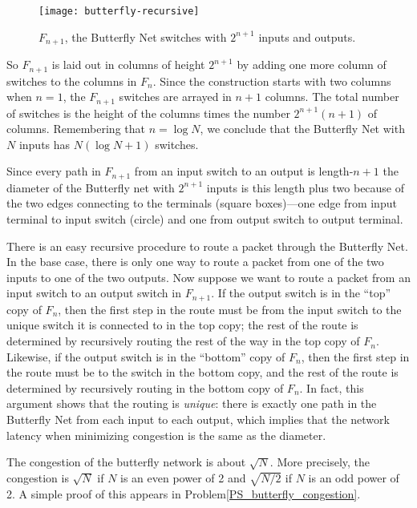 \begin{figure}
\texttt{[image: butterfly-recursive]}
\caption{$F_{n+1}$, the Butterfly Net switches with $2^{n+1}$ inputs
and outputs.}
\label{fig:butterfly-recursive}
\end{figure}

So $F_{n+1}$ is laid out in columns of height $2^{n+1}$ by adding one
more column of switches to the columns in $F_n$.  Since the
construction starts with two columns when $n=1$, the $F_{n+1}$
switches are arrayed in $n+1$ columns.  The total number of switches
is the height of the columns times the number $2^{n+1}(n+1)$ of
columns.  Remembering that $n=\log N$, we conclude that the Butterfly
Net with $N$ inputs has $N(\log N +1)$ switches.

Since every path in $F_{n+1}$ from an input switch to an output is
length-$n+1$ the diameter of the Butterfly net with $2^{n+1}$ inputs
is this length plus two because of the two edges connecting to the
terminals (square boxes)---one edge from input terminal to input
switch (circle) and one from output switch to output terminal.

There is an easy recursive procedure to route a packet through the
Butterfly Net.  In the base case, there is only one way to route
a packet from one of the two inputs to one of the two outputs.  Now
suppose we want to route a packet from an input switch to an output switch
in $F_{n+1}$.  If the output switch is in the ``top'' copy of $F_n$, then
the first step in the route must be from the input switch to the unique
switch it is connected to in the top copy; the rest of the route is
determined by recursively routing the rest of the way in the top copy of
$F_n$.  Likewise, if the output switch is in the ``bottom'' copy of $F_n$,
then the first step in the route must be to the switch in the bottom copy,
and the rest of the route is determined by recursively routing in the
bottom copy of $F_n$.  In fact, this argument shows that the routing is
\emph{unique}: there is exactly one path in the Butterfly Net from each
input to each output, which implies that the network latency when
minimizing congestion is the same as the diameter.

The congestion of the butterfly network is about $\sqrt{N}$.  More
precisely, the congestion is $\sqrt{N}$ if $N$ is an even power of 2 and
$\sqrt{N/2}$ if $N$ is an odd power of 2.  A simple proof of this appears
in Problem\ref{PS_butterfly_congestion}.

